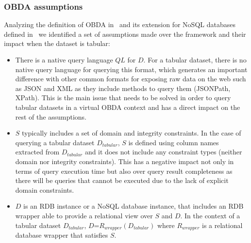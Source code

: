 \subsubsection{OBDA assumptions}
Analyzing the definition of OBDA in~\citep{xiao2018obdasurvey} and its extension for NoSQL databases defined in~\citep{botoeva2019ontology} we identified a set of assumptions made over the framework and their impact when the dataset is tabular:
\begin{itemize}
    \item There is a native query language $QL$ for $D$. For a tabular dataset, there is no native query language for querying this format, which generates an important difference with other common formats for exposing raw data on the web such as JSON and XML as they include methods to query them (JSONPath, XPath). This is the main issue that needs to be solved in order to query tabular datasets in a virtual OBDA context and has a direct impact on the rest of the assumptions.%
    \item $S$ typically includes a set of domain and integrity constraints. In the case of querying a tabular dataset $D_{tabular}$, $S$ is defined using column names extracted from $D_{tabular}$ and it does not include any  constraint types (neither domain nor integrity constraints). This has a negative impact not only in terms of query execution time but also over query result completeness as there will be queries that cannot be executed due to the lack of explicit domain constraints.
    \item $D$ is an RDB instance or  a NoSQL database instance, %
    that includes an RDB wrapper able to provide a relational view over $S$ and $D$. In the context of a tabular dataset $D_{tabular}$, $D$=$R_{wrapper}(D_{tabular})$ where $R_{wrapper}$ is a relational database wrapper that satisfies $S$.
\end{itemize}

